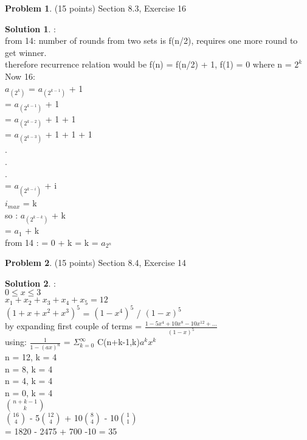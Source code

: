 \documentclass{article}
\theoremstyle{definition}
\newtheorem{problem}{Problem}
\newtheorem*{solution}{Solution}
\begin{document}
\begin{problem} (15 points) Section 8.3, Exercise 16
\end{problem}
\begin{solution} :
\\
from 14: number of rounds from two sets is f(n/2), requires one more round to get winner.
\\
therefore recurrence relation would be f(n) = f(n/2) + 1, f(1) = 0 where n = $2^k$
\\

Now 16:
\\
$a_{(2^{k})}$ = $a_{(2^{k-1})}$ + 1\\
= $a_{(2^{k-1})}$ + 1\\
= $a_{(2^{k-2})}$ + 1 + 1\\
= $a_{(2^{k-3})}$ + 1 + 1 + 1\\
.
\\
.\\
.\\
= $a_{(2^{k-i})}$ + i
\\
$i_{max}$ = k
\\
so : $a_{(2^{k-k})}$ + k
\\
= $a_1$ + k
\\
from 14 : = 0 + k = k = $a_{2^n}$
 
\end{solution}

\newpage

\begin{problem} (15 points) Section 8.4, Exercise 14
\end{problem}
\begin{solution} :
\\

$0\leq x \leq 3$\\
$x_1 + x_2 + x_3 + x_4 + x_5 = 12 $\\
$(1+x+x^2+x^3)^5$ = $(1-x^4)^5$ / $(1-x)^5$\\
by expanding first couple of terms = $\frac{1 - 5x^4 + 10x^8 - 10x^{12} +...}{(1-x)^5}$\\
using: $\frac{1}{1-(ax)^n}$ = $\Sigma_{k=0}^{\infty}$ C(n+k-1,k)$a^k x^k$\\
n = 12, k = 4 \\ 
n = 8, k = 4 \\ 
n = 4, k = 4 \\ 
n = 0, k = 4 \\ 

$n+k-1 \choose k$\\

$16 \choose 4$ - 5$12 \choose 4$ + 10$8 \choose 4$ - 10$1 \choose 1$ \\

= 1820 - 2475 + 700 -10 = 35
 
\end{solution}
\end{document}

